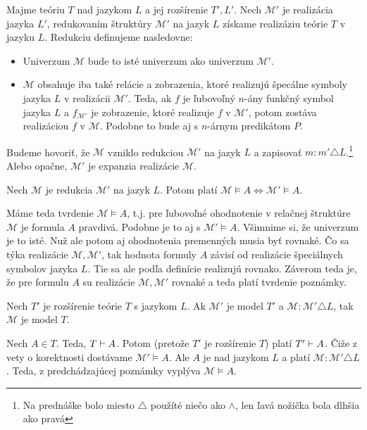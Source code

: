 \begin{definicia}[Redukcia]
    Majme teóriu $T$ nad jazykom $L$ a jej rozšírenie $T',L'$.
    Nech $\mathcal{M}'$ je realizácia jazyka $L'$,
    redukovaním štruktúry $\mathcal{M}'$ na jazyk $L$
    získame realizáziu teórie $T$ v jazyku $L$.
    Redukciu definujeme nasledovne:
    \begin{itemize}
    \item Univerzum $\mathcal{M}$ bude to isté univerzum ako univerzum
        $\mathcal{M}'$.

    \item $\mathcal{M}$ obsahuje iba také relácie a zobrazenia,
        ktoré realizujú špecálne symboly jazyka $L$ v realizácii
        $\mathcal{M}'$. Teda, ak $f$ je ľubovoľný $n$-ány funkčný
        symbol jazyka $L$ a $f_{\mathcal{M}'}$ je zobrazenie,
        ktoré realizuje $f$ v $\mathcal{M}'$,
        potom zostáva realizáciou $f$ v $\mathcal{M}$.
        Podobne to bude aj s $n$-árnym predikátom $P$.
    \end{itemize}
    
    Budeme hovoriť, že $\mathcal{M}$ vzniklo redukciou $\mathcal{M}'$ 
    na jazyk $L$ a zapisovať $m: m' \triangle L$.\footnote{
        Na prednáške bolo miesto $\triangle$ použíté niečo ako $\land$,
        len ľavá nožička bola dlhšia ako pravá}
    Alebo opačne, $\mathcal{M}'$ je expanzia realizácie $\mathcal{M}$.
\end{definicia}

\begin{poznamka}
    Nech $\mathcal{M}$ je redukcia $\mathcal{M}'$ na jazyk $L$.
    Potom platí $\mathcal{M} \models A \iff \mathcal{M}' \models A$.
\end{poznamka}
\begin{dokaz}
    Máme teda tvrdenie $\mathcal{M} \models A$, t.j. pre ľubovoľné
    ohodnotenie v relačnej štruktúre $\mathcal{M}$ je formula $A$
    pravdivá. Podobne je to aj s $\mathcal{M}' \models A$.
    Všimnime si, že univerzum je to isté. Nuž ale potom aj ohodnotenia
    premenných musia byť rovnaké. Čo sa týka realizácie
    $\mathcal{M}, \mathcal{M}'$, tak hodnota formuly $A$ závisí
    od realizácie špeciálnych symbolov jazyka $L$. Tie sa ale podľa
    definície realizujú rovnako. Záverom teda je, že pre formulu
    $A$ su realizácie $\mathcal{M}, \mathcal{M'}$ rovnaké a teda platí
    tvrdenie poznámky.
\end{dokaz}

\begin{veta}
    Nech $T'$ je rozšírenie teórie $T$ s jazykom $L$.
    Ak $\mathcal{M}'$ je model $T'$ a 
    $\mathcal{M}:\mathcal{M}'\triangle L$, tak $\mathcal{M}$ je model $T$.
\end{veta}
\begin{dokaz}
    Nech $A \in T$. Teda, $T \vdash A$. Potom (pretože $T'$ je
    rozšírenie $T$) platí $T' \vdash A$.
    Čiže z vety o korektnosti dostávame $\mathcal{M}' \models A$. Ale
    $A$ je nad jazykom $L$ a platí $\mathcal{M}: \mathcal{M'}
    \triangle L$. Teda, z predchádzajúcej poznámky vyplýva
    $\mathcal{M} \models A$.
\end{dokaz}

